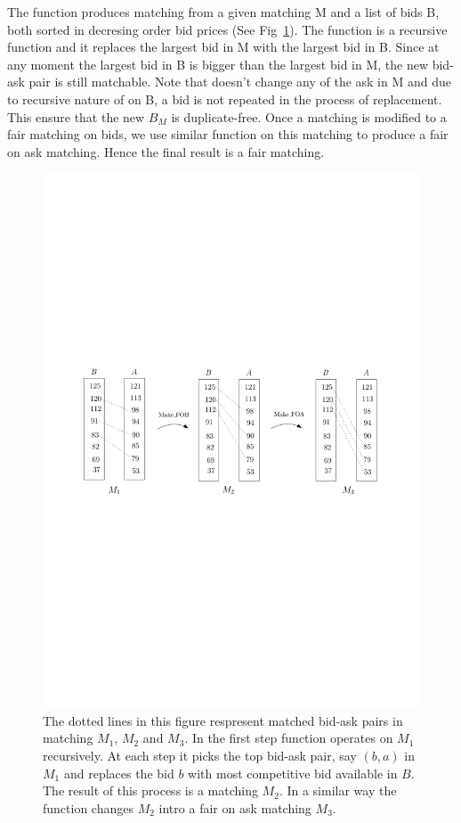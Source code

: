 \documentclass[a4paper,UKenglish,cleveref, autoref]{lipics-v2019}
\begin{document}
The function  produces  matching from a given matching M and a list of bids B, both sorted in decresing order bid prices (See Fig~\ref{fig:fair}). The function  is a recursive function and it replaces the largest bid in M with the largest bid in B. Since at any moment the largest bid in B is bigger than the largest bid in M, the new bid-ask pair is still matchable. Note that  doesn't change any of the ask in M and due to recursive nature of  on B, a bid is not repeated in the process of replacement.  This ensure that the new $B_M$ is duplicate-free. Once a matching is modified to a fair matching on bids, we use similar function  on this matching to produce a fair on ask matching. Hence the final result is a fair matching. 

\begin{figure}[h!]
\centering
\includegraphics[width=.8\textwidth]{make_fair.pdf}
\caption{The dotted lines in this figure respresent  matched bid-ask pairs in  matching $M_1$, $M_2$ and $M_3$. In the first step function  operates on $M_1$ recursively. At each step it picks the top bid-ask pair, say $(b,a)$ in $M_1$ and replaces the bid  $b$ with most competitive bid available in $B$. The result of this process is a  matching $M_2$. In a similar way the function  changes $M_2$ intro a fair on ask matching $M_3$.  }
\label{fig:fair}
\end{figure}
\end{document}
